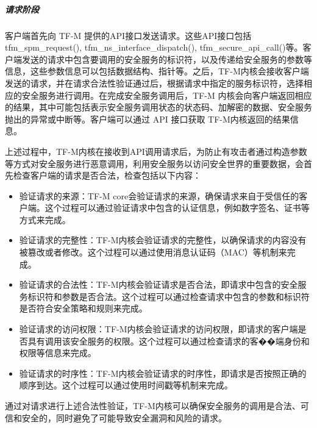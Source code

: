 \documentclass[12pt,a4paper]{ctexart}
\numberwithin{figure}{section}
\begin{document}
\subparagraph{请求阶段}
\par 客户端首先向 TF-M 提供的API接口发送请求。这些API接口包括tfm\_spm\_request(), tfm\_ns\_interface\_dispatch(), tfm\_secure\_api\_call()等。客户端发送的请求中包含要调用的安全服务的标识符，以及传递给安全服务的参数等信息，这些参数信息可以包括数据结构、指针等。之后，TF-M内核会接收客户端发送的请求，并在请求合法性验证通过后，根据请求中指定的服务标识符，选择相应的安全服务进行调用。在完成安全服务调用后，TF-M 内核会向客户端返回相应的结果，其中可能包括表示安全服务调用状态的状态码、加解密的数据、安全服务抛出的异常或中断等。客户端可以通过 API 接口获取 TF-M内核返回的结果信息。
\par 上述过程中，TF-M内核在接收到API调用请求后，为防止有攻击者通过构造参数等方式对安全服务进行恶意调用，利用安全服务以访问安全世界的重要数据，会首先检查客户端的请求是否合法，检查包括以下内容：
\begin{itemize}
    \item 验证请求的来源：TF-M core会验证请求的来源，确保请求来自于受信任的客户端。这个过程可以通过验证请求中包含的认证信息，例如数字签名、证书等方式来完成。
    \item 验证请求的完整性：TF-M内核会验证请求的完整性，以确保请求的内容没有被篡改或者修改。这个过程可以通过使用消息认证码（MAC）等机制来完成。
    \item  验证请求的合法性：TF-M内核会验证请求是否合法，即请求中包含的安全服务标识符和参数是否合法。这个过程可以通过检查请求中包含的参数和标识符是否符合安全策略和规则来完成。
    \item  验证请求的访问权限：TF-M内核会验证请求的访问权限，即请求的客户端是否具有调用该安全服务的权限。这个过程可以通过检查请求的客��端身份和权限等信息来完成。
    \item  验证请求的时序性：TF-M内核会验证请求的时序性，即请求是否按照正确的顺序到达。这个过程可以通过使用时间戳等机制来完成。
\end{itemize}
\par 通过对请求进行上述合法性验证，TF-M内核可以确保安全服务的调用是合法、可信和安全的，同时避免了可能导致安全漏洞和风险的请求。
\end{document}
